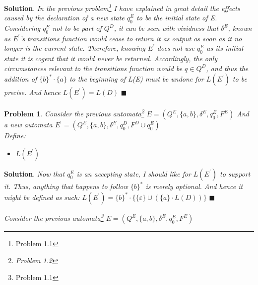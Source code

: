 \documentclass[12pt]{article}
\renewcommand{\=}[1]{\stackrel{#1}{=}} %
\newtheorem{p}{Problem}[section]
\theoremstyle{definition}
\newenvironment{s}{%
        \begin{trivlist} \item \textbf{Solution}. }{%
            \hspace*{\fill} $\blacksquare$\end{trivlist}}%
\begin{document}
\begin{s} \newline
  \emph{In the previous problem\footnote{Problem 1.1} I have explained in great detail the effects caused by the declaration of a new state $q_0^{E}$ to be the initial state of E. Considering $q_0^{E}$ not to be part of $Q^{D}$, it can be seen with vividness that $\delta^{E}$, known as $E^{\prime}$'s transitions function would cease to return it as output as soon as it no longer is the current state. Therefore, knowing $E^{\prime}$ does not use $q_0^{E}$ as its initial state it is cogent that it would never be returned. Accordingly, the only circumstances relevant to the transitions function would be $q \in Q^{D}$, and thus the addition of $\{b\}^{*} \cdot \{a\}$ to the beginning of L(E) must be undone for $L(E^{\prime})$ to be precise. And hence $L(E^{\prime}) = L(D)$}
\end{s}
\begin{p}
  \emph{\newline Consider the previous automata\footnote{Problem 1.2} $E = (Q^{E}, \{a,b\}, \delta^{E}, q_0^{E}, F^{E})$} \newline
  \emph{And a new automata $E^{\prime} = (Q^{E}, \{a,b\}, \delta^{E}, q_0^{D}, F^{D} \cup q_0^{E})$} \newline
  \\
  Define: 
  \begin{itemize}
    \item $L(E^{\prime})$
  \end{itemize}
\end{p}
\begin{s} \newline
  \emph{Now that $q_0^{E}$ is an accepting state, I should like for $L(E^{\prime})$ to support it. Thus, anything that happens to follow $\{b\}^{*}$ is merely optional. And hence it might be defined as such: $L(E^{\prime}) = \{b\}^{*} \cdot \{\{\varepsilon\} \cup (\{a\} \cdot L(D))\}$} 
\end{s}
  \emph{\newline Consider the previous automata\footnote{Problem 1.1} $E = (Q^{E}, \{a,b\}, \delta^{E}, q_0^{E}, F^{E})$} \newline
\newpage
\end{document}
